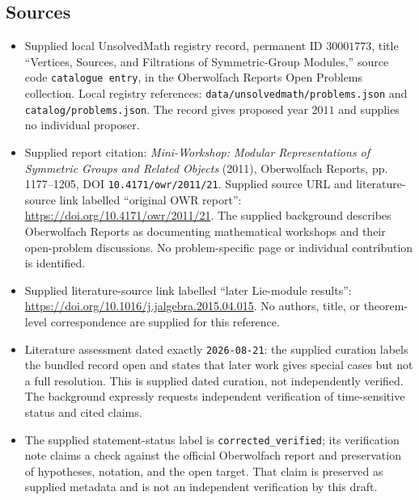 \documentclass[11pt]{article}
\begin{document}
\subsection{Sources}
\begin{itemize}
\item Supplied local UnsolvedMath registry record, permanent ID \(30001773\), title ``Vertices, Sources, and Filtrations of Symmetric-Group Modules,'' source code \texttt{catalogue entry}, in the Oberwolfach Reports Open Problems collection. Local registry references: \texttt{data/unsolvedmath/problems.json} and \texttt{catalog/problems.json}. The record gives proposed year \(2011\) and supplies no individual proposer.
\item Supplied report citation: \emph{Mini-Workshop: Modular Representations of Symmetric Groups and Related Objects} (2011), Oberwolfach Reports, pp. 1177--1205, DOI \texttt{10.4171/owr/2011/21}. Supplied source URL and literature-source link labelled ``original OWR report'': \url{https://doi.org/10.4171/owr/2011/21}. The supplied background describes Oberwolfach Reports as documenting mathematical workshops and their open-problem discussions. No problem-specific page or individual contribution is identified.
\item Supplied literature-source link labelled ``later Lie-module results'': \url{https://doi.org/10.1016/j.jalgebra.2015.04.015}. No authors, title, or theorem-level correspondence are supplied for this reference.
\item Literature assessment dated exactly \texttt{2026-08-21}: the supplied curation labels the bundled record open and states that later work gives special cases but not a full resolution. This is supplied dated curation, not independently verified. The background expressly requests independent verification of time-sensitive status and cited claims.
\item The supplied statement-status label is \texttt{corrected\_verified}; its verification note claims a check against the official Oberwolfach report and preservation of hypotheses, notation, and the open target. That claim is preserved as supplied metadata and is not an independent verification by this draft.
\end{itemize}
\end{document}
